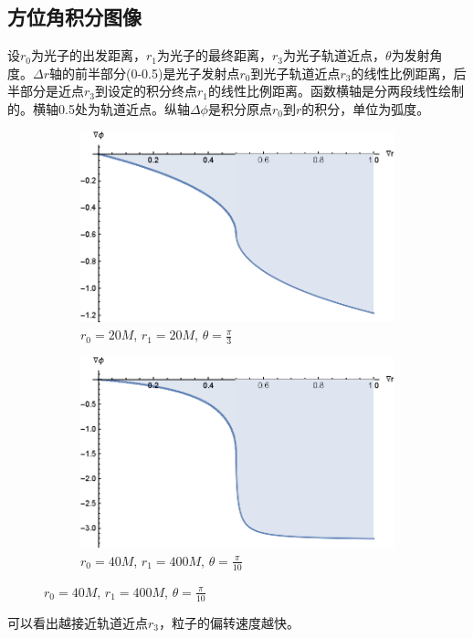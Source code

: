 \subsection{方位角积分图像}
设$r_0$为光子的出发距离，$r_1$为光子的最终距离，$r_3$为光子轨道近点，$\theta$为发射角度。$\Delta r$轴的前半部分(0-0.5)是光子发射点$r_0$到光子轨道近点$r_3$的线性比例距离，后半部分是近点$r_3$到设定的积分终点$r_1$的线性比例距离。函数横轴是分两段线性绘制的。横轴0.5处为轨道近点。纵轴$\Delta\phi$是积分原点$r_0$到$r$的积分，单位为弧度。
\begin{figure}[htbp]
    \centering
    \begin{subfigure}{.5\textwidth}
        \centering
        \includegraphics[width=.8\linewidth]{images/dphi_1.eps}
        \caption{$r_0=20M$, $r_1=20M$, $\theta=\frac{\pi}{3}$}\label{dphi_1} %
    \end{subfigure}%
    \begin{subfigure}{.5\textwidth}
        \centering
        \includegraphics[width=.8\linewidth]{images/dphi_2.eps}
        \caption{$r_0=40M$, $r_1=400M$, $\theta=\frac{\pi}{10}$}\label{dphi_2} %
    \end{subfigure}
\end{figure}
可以看出越接近轨道近点$r_3$，粒子的偏转速度越快。

